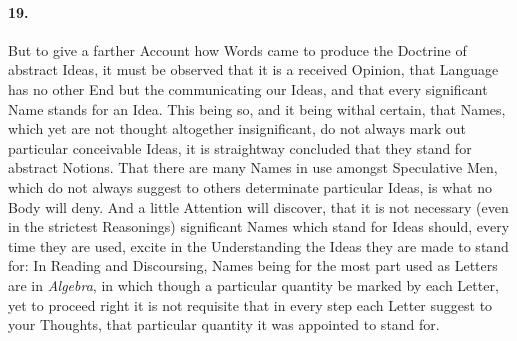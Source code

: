 \documentclass[]{article}
\newenvironment{sectionbody}{}{}
\begin{document}
\begin{sectionbody}
\paragraph{19.} But to give a farther Account how Words came to produce the
Doctrine of abstract Ideas, it must be observed that it is a
received Opinion, that Language has no other End but the
communicating our Ideas, and that every significant Name stands
for an Idea.  This being so, and it being withal certain, that
Names, which yet are not thought altogether insignificant, do not
always mark out particular conceivable Ideas, it is straightway
concluded that they stand for abstract Notions.  That there are
many Names in use amongst Speculative Men, which do not always
suggest to others determinate particular Ideas, is what no Body
will deny.  And a little Attention will discover, that it is not
necessary (even in the strictest Reasonings) significant Names
which stand for Ideas should, every time they are used, excite in
the Understanding the Ideas they are made to stand for:  In
Reading and Discoursing, Names being for the most part used as
Letters are in \emph{Algebra}, in which though a particular
quantity be marked by each Letter, yet to proceed right it is not
requisite that in every step each Letter suggest to your
Thoughts, that particular quantity it was appointed to stand for.




\end{sectionbody}
\end{document}
